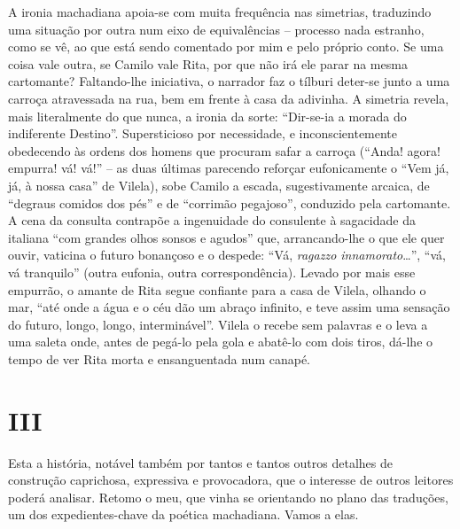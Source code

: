 A ironia machadiana apoia-se com muita frequência nas simetrias,
traduzindo uma situação por outra num eixo de equivalências -- processo
nada estranho, como se vê, ao que está sendo comentado por mim e pelo
próprio conto. Se uma coisa vale outra, se Camilo vale Rita, por que não
irá ele parar na mesma cartomante? Faltando-lhe iniciativa, o narrador
faz o tílburi deter-se junto a uma carroça atravessada na rua, bem em
frente à casa da adivinha. A simetria revela, mais literalmente do que
nunca, a ironia da sorte: ``Dir-se-ia a morada do indiferente Destino''.
Supersticioso por necessidade, e inconscientemente obedecendo às ordens
dos homens que procuram safar a carroça (``Anda! agora! empurra! vá!
vá!'' -- as duas últimas parecendo reforçar eufonicamente o ``Vem já,
já, à nossa casa'' de Vilela), sobe Camilo a escada, sugestivamente
arcaica, de ``degraus comidos dos pés'' e de ``corrimão pegajoso'',
conduzido pela cartomante. A cena da consulta contrapõe a ingenuidade do
consulente à sagacidade da italiana ``com grandes olhos sonsos e
agudos'' que, arrancando-lhe o que ele quer ouvir, vaticina o futuro
bonançoso e o despede: ``Vá, \emph{ragazzo innamorato}\ldots{}'', ``vá,
vá tranquilo'' (outra eufonia, outra correspondência). Levado por mais
esse empurrão, o amante de Rita segue confiante para a casa de Vilela,
olhando o mar, ``até onde a água e o céu dão um abraço infinito, e teve
assim uma sensação do futuro, longo, longo, interminável''. Vilela o
recebe sem palavras e o leva a uma saleta onde, antes de pegá-lo pela
gola e abatê-lo com dois tiros, dá-lhe o tempo de ver Rita morta e
ensanguentada num canapé.

\section{III}

Esta a história, notável também por tantos e tantos outros detalhes de
construção caprichosa, expressiva e provocadora, que o interesse de
outros leitores poderá analisar. Retomo o meu, que vinha se orientando
no plano das traduções, um dos expedientes-chave da poética machadiana.
Vamos a elas.

